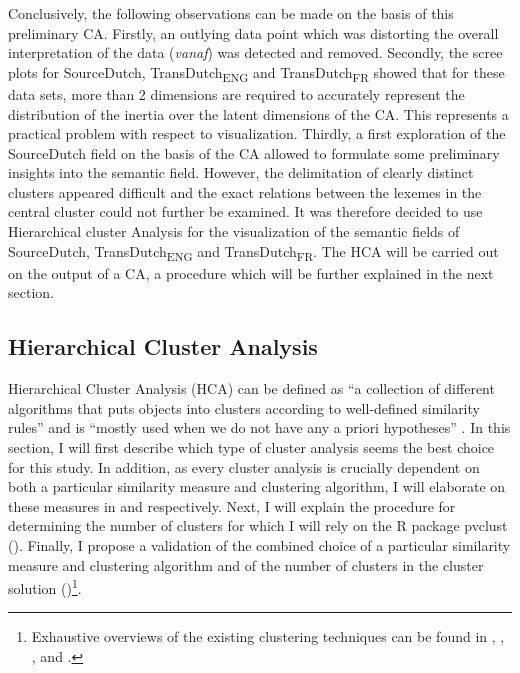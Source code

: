 Conclusively, the following observations can be made on the basis of this preliminary CA. Firstly, an outlying data point which was distorting the overall interpretation of the data (\textit{vanaf}) was detected and removed. Secondly, the scree plots for SourceDutch, TransDutch\textsubscript{ENG} and TransDutch\textsubscript{FR} showed that for these data sets, more than 2 dimensions are required to accurately represent the distribution of the inertia over the latent dimensions of the CA. This represents a practical problem with respect to visualization. Thirdly, a first exploration of the SourceDutch field on the basis of the CA allowed to formulate some preliminary insights into the semantic field. However, the delimitation of clearly distinct clusters appeared difficult and the exact relations between the lexemes in the central cluster could not further be examined. It was therefore decided to use Hierarchical cluster Analysis for the visualization of the semantic fields of SourceDutch, TransDutch\textsubscript{ENG} and TransDutch\textsubscript{FR}. The HCA will be carried out on the output of a CA, a procedure which will be further explained in the next section.

\subsection{Hierarchical Cluster Analysis}
\label{sec:3.7.2}  
Hierarchical Cluster Analysis (HCA) can be defined as “a collection of different algorithms that puts objects into clusters according to well-defined similarity rules” and is “mostly used when we do not have any a priori hypotheses” \citep[406]{glynn_cluster_2014}. In this section, I will first describe which type of cluster analysis seems the best choice for this study. In addition, as every cluster analysis is crucially dependent on both a particular similarity measure and clustering algorithm, I will elaborate on these measures in  and  respectively. Next, I will explain the procedure for determining the number of clusters for which I will rely on the R package pvclust \citep{suzuki_pvclust:_2006} (). Finally, I propose a validation of the combined choice of a particular similarity measure and clustering algorithm and of the number of clusters in the cluster solution ()\footnote{Exhaustive overviews of the existing clustering techniques can be found in \citet[495--523]{manning_foundations_1999}, \citet[138--148]{baayen_analyzing_2008},  \citet[71--110]{everitt_cluster_2011}, \citet[336--349]{gries_statistics_2013} and \citet{glynn_cluster_2014}.}.

